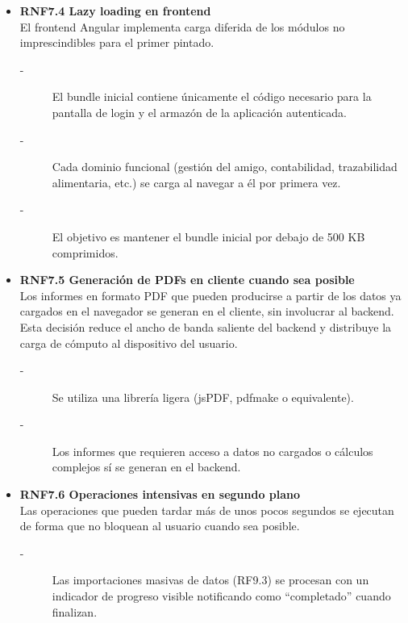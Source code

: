 \begin{itemize}
    \item \textbf{RNF7.4 Lazy loading en frontend} \\
    El frontend Angular implementa carga diferida de los módulos no
    imprescindibles para el primer pintado.
    \begin{description}
        \item[-] El bundle inicial contiene únicamente el código necesario para la
        pantalla de login y el armazón de la aplicación autenticada. 
        \item[-] Cada dominio funcional (gestión del amigo, contabilidad,
        trazabilidad alimentaria, etc.) se carga al navegar a él por
        primera vez.
        \item[-] El objetivo es mantener el bundle inicial por debajo de 500 KB comprimidos.
    \end{description}


    \item \textbf{RNF7.5 Generación de PDFs en cliente cuando sea posible} \\
    Los informes en formato PDF que pueden producirse a partir de los
    datos ya cargados en el navegador se generan en el cliente, sin
    involucrar al backend. Esta decisión reduce el ancho de banda saliente del backend y
    distribuye la carga de cómputo al dispositivo del usuario.
    \begin{description}
        \item[-] Se utiliza una librería ligera (jsPDF, pdfmake o equivalente). 
        \item[-] Los informes que requieren acceso a datos no cargados o cálculos
        complejos sí se generan en el backend.
    \end{description}


    \item \textbf{RNF7.6 Operaciones intensivas en segundo plano} \\
    Las operaciones que pueden tardar más de unos pocos segundos se
    ejecutan de forma que no bloquean al usuario cuando sea posible.
    \begin{description}
        \item[-] Las importaciones masivas de datos (RF9.3) se procesan con un
        indicador de progreso visible notificando como ``completado'' cuando finalizan.
    \end{description}
\end{itemize}



